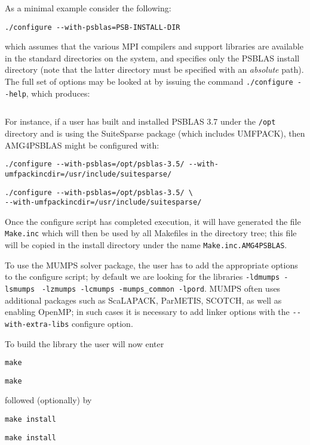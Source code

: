 As a minimal example consider the following:
\begin{verbatim}
./configure --with-psblas=PSB-INSTALL-DIR
\end{verbatim}
which assumes that the various MPI compilers and support libraries are
available in the standard directories on the system, and specifies
only the PSBLAS install  directory (note that the latter directory must
be specified with an {\em absolute} path).
The full set of options may be looked at by issuing the command
\verb|./configure --help|, which produces:
\ifpdf
\inputminted[breaklines=true,bgcolor=bg,fontsize=\small]{console}{../configureout.txt}
\else

\fi
For instance, if a user has built and installed PSBLAS 3.7 under the
\verb|/opt| directory and is
using the SuiteSparse package (which includes UMFPACK), then AMG4PSBLAS
might be configured with:
\ifpdf
\begin{verbatim}
./configure --with-psblas=/opt/psblas-3.5/ --with-umfpackincdir=/usr/include/suitesparse/
\end{verbatim}
\else
\begin{verbatim}
./configure --with-psblas=/opt/psblas-3.5/ \
--with-umfpackincdir=/usr/include/suitesparse/
\end{verbatim}
\fi
Once the configure script has completed execution, it will have
generated the file \verb|Make.inc| which will then be used by all
Makefiles in the directory tree; this file will be copied in the
install directory under the name \verb|Make.inc.AMG4PSBLAS|.

To use the MUMPS solver package,
the user has to add the appropriate options to the configure script;
by default we are looking for the libraries
\verb|-ldmumps -lsmumps| \verb| -lzmumps -lcmumps -mumps_common -lpord|.
MUMPS often uses additional packages such as ScaLAPACK, ParMETIS,
SCOTCH, as well as enabling OpenMP; in such cases it is necessary to
add linker options with the \verb|--with-extra-libs| configure option.

To build the library the user will now enter
\ifpdf
\begin{verbatim}
make
\end{verbatim}
\else
\begin{verbatim}
make
\end{verbatim}
\fi
followed (optionally) by
\ifpdf
\begin{verbatim}
make install
\end{verbatim}
\else
\begin{verbatim}
make install
\end{verbatim}
\fi
